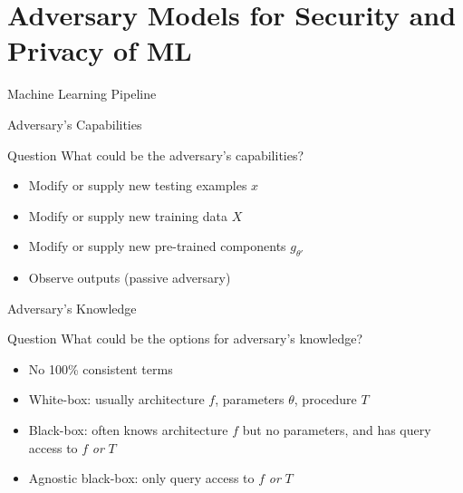 \documentclass[10pt]{beamer}
\begin{document}
\section{Adversary Models for Security and Privacy of ML}

\begin{frame}[fragile]{Machine Learning Pipeline}
  
\end{frame}

\begin{frame}[fragile]{Adversary's Capabilities}
  \centering
  

  \begin{alertblock}{Question}
    What could be the adversary's capabilities?
  \end{alertblock}

  \pause

  \begin{itemize}[<+-| alert@+>]
    \item Modify or supply new testing examples $x$
    \pause
    \item Modify or supply new training data $X$
    \pause
    \item Modify or supply new pre-trained components $g_{\theta'}$
    \pause
    \item Observe outputs (passive adversary)
  \end{itemize}
\end{frame}


\begin{frame}[fragile]{Adversary's Knowledge}
  \centering
  

  \begin{alertblock}{Question}
    What could be the options for adversary's knowledge?
  \end{alertblock}

  \pause

  \begin{itemize}[<+-| alert@+>]
    \item No 100\% consistent terms
    \pause
    \item White-box: usually architecture $f$, parameters $\theta$, procedure $T$
    \pause
    \item Black-box: often knows architecture $f$ but no parameters, and has query access to $f$
        \emph{or} $T$
    \pause
    \item Agnostic black-box: only query access to $f$ \emph{or} $T$
  \end{itemize}

\end{frame}
\end{document}
